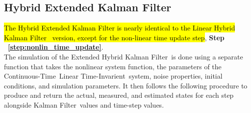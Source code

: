 \documentclass[]{article}
\newcommand{\KF}{Kalman Filter}
\newcommand{\CT}{Continuous-Time}
\newcommand{\LTI}{Linear Time-Invarient}
\begin{document}
	\newpage
	\subsection{Hybrid Extended \KF} \label{sec:HybridEKF}
		\hl{The Hybrid Extended Kalman Filter is nearly identical to the Linear Hybrid Kalman Filter \ version, except for the non-linear time update step}, \textbf{Step \ \ref{step:nonlin_time_update}}.\\
		
		The simulation of the Extended Hybrid \KF \ is done using a separate function that takes the nonlinear system function, the parameters of the \CT \ \LTI \ system, noise properties, initial conditions, and simulation parameters. It then follows the following procedure to produce and return the actual, measured, and estimated states for each step alongside \KF \ values and time-step values.
\end{document}

